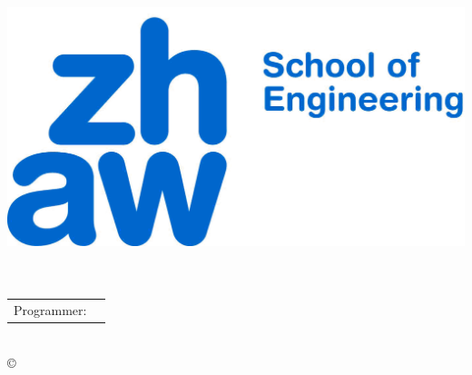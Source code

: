 \begin{titlepage}									%

\begin{center} 									%
\includegraphics[scale=0.2]{pic/zhaw_soe_d1.png}\\[10ex]		%
\huge{\textbf{\textsc{\titel}}}\\[5ex]						%
\LARGE{\textbf{\untertitel}}\\[4ex]						%
\normalsize										%

\begin{tabular}{w{3cm}p{6cm}}\\						%
 Programmer:	 & \quad \autorFirst\\[1.2ex]					%
\end{tabular}									%
\\[4ex]										%
\copyright\ \jahr\\[4ex]								%
\end{center}										%


\end{titlepage}
